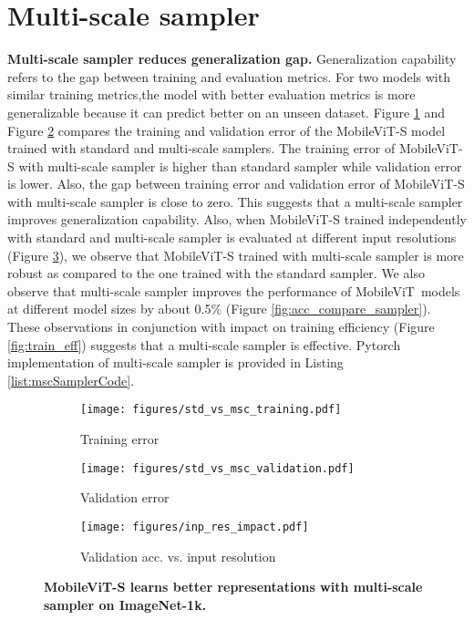 \documentclass[preprint]{article} \usepackage{iclr2022_conference,times}
\newcommand{\arch}{MobileViT}
\begin{document}
\section{Multi-scale sampler}
\label{sec:appendix_msc}

\textbf{Multi-scale sampler reduces generalization gap.} Generalization capability refers to the  gap  between  training  and  evaluation  metrics.   For  two  models  with  similar  training  metrics,the model with better evaluation metrics is more generalizable because it can predict better on an unseen dataset. Figure \ref{fig:train_error_sampler} and Figure \ref{fig:val_error_sampler} compares the training and validation error of the \arch-S model trained with standard and multi-scale samplers. The training error of \arch-S with multi-scale sampler is higher than standard sampler while validation error is lower. Also, the gap between training error and validation error of \arch-S with multi-scale sampler is close to zero. This suggests that a multi-scale sampler improves generalization capability. Also, when \arch-S trained independently with standard and multi-scale sampler is evaluated at different input resolutions (Figure \ref{fig:inp_res_impact}), we observe that \arch-S trained with multi-scale sampler is more robust as compared to the one trained with the standard sampler. We also observe that multi-scale sampler improves the performance of \arch~models at different model sizes by about 0.5\% (Figure \ref{fig:acc_compare_sampler}). These observations in conjunction with impact on training efficiency (Figure \ref{fig:train_eff}) suggests that a multi-scale sampler is effective. Pytorch implementation of multi-scale sampler is provided in Listing \ref{list:mscSamplerCode}.

\begin{figure}[t!]
    \centering
    \begin{subfigure}[b]{0.3\columnwidth}
        \centering
        \texttt{[image: figures/std\_vs\_msc\_training.pdf]}
        \caption{Training error}
        \label{fig:train_error_sampler}
    \end{subfigure}
    \hfill
    \begin{subfigure}[b]{0.3\columnwidth}
        \centering
        \texttt{[image: figures/std\_vs\_msc\_validation.pdf]}
        \caption{Validation error}
        \label{fig:val_error_sampler}
    \end{subfigure}
    \hfill
    \begin{subfigure}[b]{0.38\columnwidth}
        \centering
        \texttt{[image: figures/inp\_res\_impact.pdf]}
        \caption{Validation acc. vs. input resolution}
        \label{fig:inp_res_impact}
    \end{subfigure}
    \caption{\textbf{\arch-S learns better representations with multi-scale sampler on ImageNet-1k.}}
    \label{fig:app_sampler_results}
\end{figure}
\end{document}
